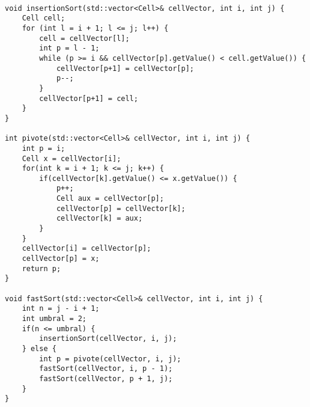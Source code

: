 \begin{lstlisting}

void insertionSort(std::vector<Cell>& cellVector, int i, int j) {
    Cell cell;
    for (int l = i + 1; l <= j; l++) {
        cell = cellVector[l];
        int p = l - 1;
        while (p >= i && cellVector[p].getValue() < cell.getValue()) {
            cellVector[p+1] = cellVector[p];
            p--;
        }
        cellVector[p+1] = cell;
    }
}

int pivote(std::vector<Cell>& cellVector, int i, int j) {
    int p = i;
    Cell x = cellVector[i];
    for(int k = i + 1; k <= j; k++) {
        if(cellVector[k].getValue() <= x.getValue()) {
            p++;
            Cell aux = cellVector[p];
            cellVector[p] = cellVector[k];
            cellVector[k] = aux;
        }
    }
    cellVector[i] = cellVector[p];
    cellVector[p] = x;
    return p;
}

void fastSort(std::vector<Cell>& cellVector, int i, int j) {
    int n = j - i + 1;
    int umbral = 2;
    if(n <= umbral) {
        insertionSort(cellVector, i, j);
    } else {
        int p = pivote(cellVector, i, j);
        fastSort(cellVector, i, p - 1);
        fastSort(cellVector, p + 1, j);
    }
}

\end{lstlisting}